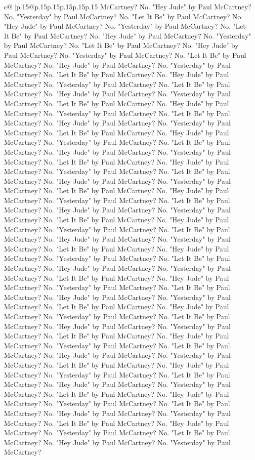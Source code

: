 \documentclass{article}
\begin{document}
{\begin{supertabular}{c@{$\;$}|p{.15\linewidth}@{}p{.15\linewidth}p{.15\linewidth}p{.15\linewidth}p{.15\linewidth}p{.15\linewidth}}
{{{McCartney? No. "Hey Jude" by Paul McCartney? No. "Yesterday" by Paul McCartney? No. "Let It Be" by Paul McCartney? No. "Hey Jude" by Paul McCartney? No. "Yesterday" by Paul McCartney? No. "Let It Be" by Paul McCartney? No. "Hey Jude" by Paul McCartney? No. "Yesterday" by Paul McCartney? No. "Let It Be" by Paul McCartney? No. "Hey Jude" by Paul McCartney? No. "Yesterday" by Paul McCartney? No. "Let It Be" by Paul McCartney? No. "Hey Jude" by Paul McCartney? No. "Yesterday" by Paul McCartney? No. "Let It Be" by Paul McCartney? No. "Hey Jude" by Paul McCartney? No. "Yesterday" by Paul McCartney? No. "Let It Be" by Paul McCartney? No. "Hey Jude" by Paul McCartney? No. "Yesterday" by Paul McCartney? No. "Let It Be" by Paul McCartney? No. "Hey Jude" by Paul McCartney? No. "Yesterday" by Paul McCartney? No. "Let It Be" by Paul McCartney? No. "Hey Jude" by Paul McCartney? No. "Yesterday" by Paul McCartney? No. "Let It Be" by Paul McCartney? No. "Hey Jude" by Paul McCartney? No. "Yesterday" by Paul McCartney? No. "Let It Be" by Paul McCartney? No. "Hey Jude" by Paul McCartney? No. "Yesterday" by Paul McCartney? No. "Let It Be" by Paul McCartney? No. "Hey Jude" by Paul McCartney? No. "Yesterday" by Paul McCartney? No. "Let It Be" by Paul McCartney? No. "Hey Jude" by Paul McCartney? No. "Yesterday" by Paul McCartney? No. "Let It Be" by Paul McCartney? No. "Hey Jude" by Paul McCartney? No. "Yesterday" by Paul McCartney? No. "Let It Be" by Paul McCartney? No. "Hey Jude" by Paul McCartney? No. "Yesterday" by Paul McCartney? No. "Let It Be" by Paul McCartney? No. "Hey Jude" by Paul McCartney? No. "Yesterday" by Paul McCartney? No. "Let It Be" by Paul McCartney? No. "Hey Jude" by Paul McCartney? No. "Yesterday" by Paul McCartney? No. "Let It Be" by Paul McCartney? No. "Hey Jude" by Paul McCartney? No. "Yesterday" by Paul McCartney? No. "Let It Be" by Paul McCartney? No. "Hey Jude" by Paul McCartney? No. "Yesterday" by Paul McCartney? No. "Let It Be" by Paul McCartney? No. "Hey Jude" by Paul McCartney? No. "Yesterday" by Paul McCartney? No. "Let It Be" by Paul McCartney? No. "Hey Jude" by Paul McCartney? No. "Yesterday" by Paul McCartney? No. "Let It Be" by Paul McCartney? No. "Hey Jude" by Paul McCartney? No. "Yesterday" by Paul McCartney? No. "Let It Be" by Paul McCartney? No. "Hey Jude" by Paul McCartney? No. "Yesterday" by Paul McCartney? No. "Let It Be" by Paul McCartney? No. "Hey Jude" by Paul McCartney? No. "Yesterday" by Paul McCartney? No. "Let It Be" by Paul McCartney? No. "Hey Jude" by Paul McCartney? No. "Yesterday" by Paul McCartney? No. "Let It Be" by Paul McCartney? No. "Hey Jude" by Paul McCartney? No. "Yesterday" by Paul McCartney? No. "Let It Be" by Paul McCartney? No. "Hey Jude" by Paul McCartney? No. "Yesterday" by Paul McCartney? No. "Let It Be" by Paul McCartney? No. "Hey Jude" by Paul McCartney? No. "Yesterday" by Paul McCartney? No. "Let It Be" by Paul McCartney? No. "Hey Jude" by Paul McCartney? No. "Yesterday" by Paul McCartney? No. "Let It Be" by Paul McCartney? No. "Hey Jude" by Paul McCartney? No. "Yesterday" by Paul McCartney? No. "Let It Be" by Paul McCartney? No. "Hey Jude" by Paul McCartney? No. "Yesterday" by Paul McCartney? }}}
\end{supertabular}}
\end{document}
